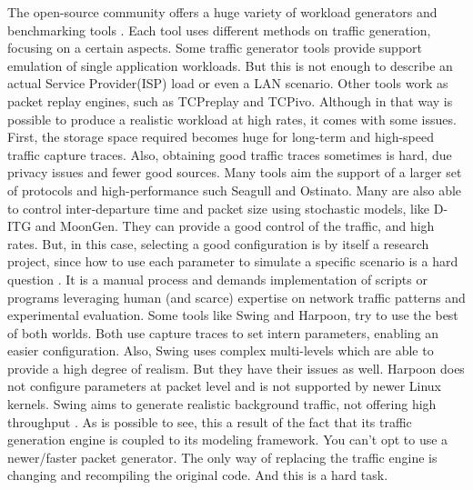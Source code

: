 The open-source community offers a huge variety of workload generators and benchmarking tools \cite{ditg-paper}\cite{validate-trafficgen}. Each tool uses different methods on traffic generation, focusing on a certain aspects. Some traffic generator tools provide support emulation of single  application workloads. But this is not enough to describe an actual Service Provider(ISP) load or even a LAN scenario. Other tools work as packet replay engines, such as TCPreplay and TCPivo. Although in that way is possible to produce a realistic workload at high rates, it comes with some issues. First, the storage space required becomes huge for long-term and high-speed traffic capture traces. Also, obtaining good traffic traces sometimes is hard, due privacy issues and fewer good sources. Many tools aim the support of a larger set of protocols and high-performance such Seagull and Ostinato. Many are also able to control inter-departure time and packet size using stochastic models, like D-ITG\cite{ditg-paper} and MoonGen. They can provide a good control of the traffic, and high rates. But, in this case, selecting a good configuration is by itself a research project, since how to use each parameter to simulate a specific scenario is a hard question \cite{selfsimilar-ethernet}. It is a manual process and demands implementation of scripts or programs leveraging human (and scarce) expertise on network traffic patterns and  experimental evaluation. Some tools like Swing and Harpoon, try to use the best of both worlds. Both use capture traces to set intern parameters, enabling an easier configuration. Also, Swing uses complex multi-levels which are able to provide a high degree of realism\cite{swing-paper}. But they have their issues as well. Harpoon does not configure parameters at packet level\cite{harpoon-paper} and is not supported by newer Linux kernels. Swing\cite{swing-paper} aims to generate realistic background traffic, not offering high throughput \cite{swing-paper} \cite{legotg-paper}. As is possible to see, this a result of the fact that its traffic generation engine is coupled to its modeling framework. You can't opt to use a newer/faster packet generator. The only way of replacing the traffic engine is changing and recompiling the original code. And this is a hard task.

